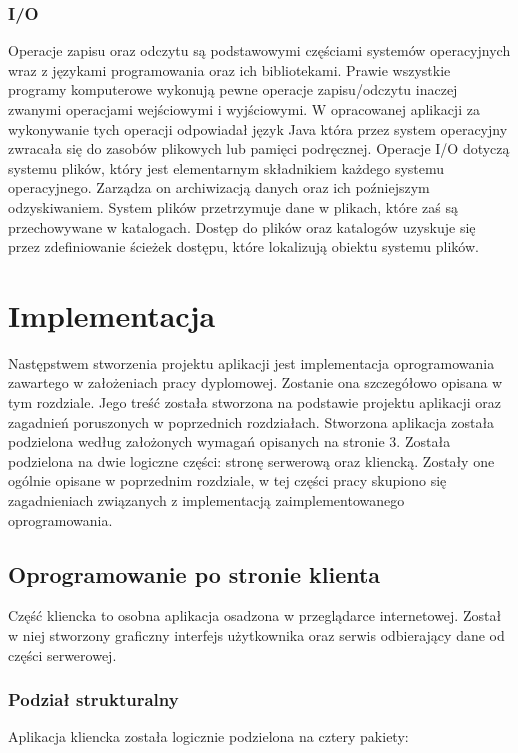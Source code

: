 \documentclass[12pt, twoside]{report}
\begin{document}
\subsection{I/O}
Operacje zapisu oraz odczytu są podstawowymi częściami systemów operacyjnych wraz z językami programowania oraz ich bibliotekami. Prawie wszystkie programy komputerowe wykonują pewne operacje zapisu/odczytu inaczej zwanymi operacjami wejściowymi i wyjściowymi. W opracowanej aplikacji za wykonywanie tych operacji odpowiadał język Java która przez system operacyjny zwracała się do zasobów plikowych lub pamięci podręcznej. Operacje I/O dotyczą systemu plików, który jest elementarnym składnikiem każdego systemu operacyjnego. Zarządza on archiwizacją danych oraz ich poźniejszym odzyskiwaniem. System plików przetrzymuje dane w plikach, które zaś są przechowywane w katalogach. Dostęp do plików oraz katalogów uzyskuje się przez zdefiniowanie ścieżek dostępu, które lokalizują obiektu systemu plików.\cite{i/o}

\newpage
\chapter{Implementacja}
Następstwem stworzenia projektu aplikacji jest implementacja oprogramowania zawartego w założeniach pracy dyplomowej. Zostanie ona szczegółowo opisana w tym rozdziale. Jego treść została stworzona na podstawie projektu aplikacji oraz zagadnień poruszonych w poprzednich rozdziałach. Stworzona aplikacja została podzielona według założonych wymagań opisanych na stronie 3. Została podzielona na dwie logiczne części: stronę serwerową oraz kliencką. Zostały one ogólnie opisane w poprzednim rozdziale, w tej części pracy skupiono się zagadnieniach związanych z implementacją zaimplementowanego oprogramowania.

\section{Oprogramowanie po stronie klienta}
Część kliencka to osobna aplikacja osadzona w przeglądarce internetowej. Został w niej stworzony graficzny interfejs użytkownika oraz serwis odbierający dane od części serwerowej.
\subsection{Podział strukturalny}
Aplikacja kliencka została logicznie podzielona na cztery pakiety: 
\end{document}
